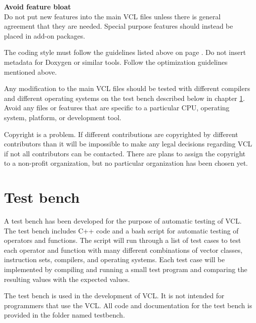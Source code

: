 \documentclass[vcl_manual.tex]{subfiles}
\begin{document}

\textbf{Avoid feature bloat}\\
Do not put new features into the main VCL files unless there is general agreement that they are needed. Special purpose features should instead be placed in add-on packages.

The coding style must follow the guidelines listed above on page \pageref{CodingStyle}. Do not insert metadata for Doxygen or similar tools. Follow the optimization guidelines mentioned above.

Any modification to the main VCL files should be tested with different compilers and different operating systems on the test bench described below in chapter \ref{chap:TestBench}. Avoid any files or features that are specific to a particular CPU, operating system, platform, or development tool.

Copyright is a problem. If different contributions are copyrighted by different contributors than it will be impossible to make any legal decisions regarding VCL if not all contributors can be contacted. There are plans to assign the copyright to a non-profit organization, but no particular organization has been chosen yet.


\section{Test bench}\label{chap:TestBench}
A test bench has been developed for the purpose of automatic testing of VCL.
The test bench includes C++ code and a bash script for automatic testing of operators and functions. The script will run through a list of test cases to test each operator and function with many different combinations of vector classes, instruction sets, compilers, and operating systems. Each test case will be implemented by compiling and running a small test program and comparing the resulting values with the expected values.

The test bench is used in the development of VCL. It is not intended for programmers that use the VCL. All code and documentation for the test bench is provided in the folder named testbench.
\end{document}
